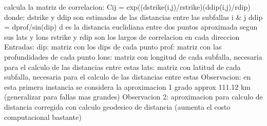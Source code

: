 \documentclass[letterpaper,10pt,english]{sphinxmanual}
\begin{document}
\begin{fulllineitems}
\label{\detokenize{main:main.matriz_covarianza}}
\pysigstartsignatures
{}
\pysigstopsignatures
\sphinxAtStartPar
calcula la matriz de correlacion:
Cij = exp(\sphinxhyphen{}(dstrike(i,j)/rstrike)\sphinxhyphen{}(ddip(i,j)/rdip)
donde:
dstrike y ddip son estimados de las distancias entre las subfallas i \& j
ddip = dprof/sin(dip)
d es la distancia euclidiana entre dos puntos aproximada segun sus lats y lons
rstrike y rdip son los largos de correlacion en cada direccion 
Entradas: 
dip: matriz con los dips de cada punto
prof: matriz con las profundidades de cada punto
lons: matriz con longitud de cada subfalla, necesaria para el calculo de las distancias entre estas
lats: matriz con latitud de cada subfalla, necesaria para el calculo de las distancias entre estas
Observacion: en esta primera instancia se considera la aproximacion  1 grado approx 111.12 km (generalizar para fallas mas grandes)
Observacion 2: aproximacion para calculo de distancia corregida con calculo geodesico de distancia (aumenta el costo computacional bastante)

\end{fulllineitems}

\end{document}
